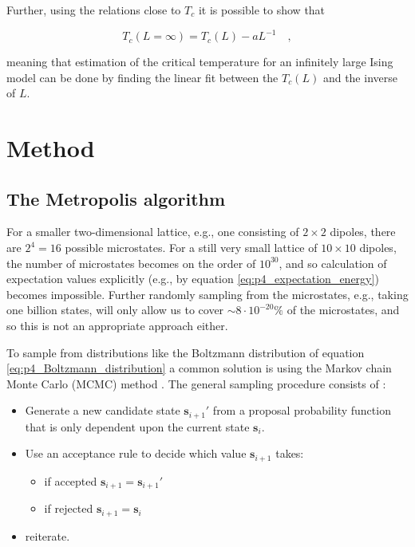 \documentclass[../main_proj4_correct_template.tex]{subfiles}
\begin{document}
Further, using the relations close to $T_c$ it is possible to show that

\begin{equation}
 T_c(L=\infty) = T_c(L) - aL^{-1} \quad,
\end{equation}

meaning that estimation of the critical temperature for an infinitely large Ising model can be done by finding the linear fit between the $T_c(L)$ and the inverse of $L$.


\section{Method}\label{sec:p4_method}

\subsection{The Metropolis algorithm}

For a smaller two-dimensional lattice, e.g., one consisting of $2\times 2$ dipoles, there are $2^{4}=16$ possible microstates. For a still very small lattice of $10\times 10$ dipoles, the number of microstates becomes on the order of $10^{30}$, and so calculation of expectation values explicitly (e.g., by equation \eqref{eq:p4_expectation_energy}) becomes impossible. Further randomly sampling from the microstates, e.g., taking one billion states, will only allow us to cover $\sim 8\cdot10^{-20} \%$ of the microstates, and so this is not an appropriate approach either.

To sample from distributions like the Boltzmann distribution of equation \eqref{eq:p4_Boltzmann_distribution} a common solution is using the Markov chain Monte Carlo (MCMC) method \cite{lecture_notes}. The general sampling procedure consists of :
\begin{itemize}
    \item Generate a new candidate state $\mathbf{s}_{i+1}'$ from a proposal probability function that is only dependent upon the current state $\mathbf{s}_i$.
    \item Use an acceptance rule to decide which value $\mathbf{s}_{i+1}$ takes:
    \begin{itemize}
        \item if accepted $\mathbf{s}_{i+1} = \mathbf{s}_{i+1}'$
        \item if rejected $\mathbf{s}_{i+1} = \mathbf{s}_i$
    \end{itemize}
    \item reiterate.
\end{itemize}
\end{document}
